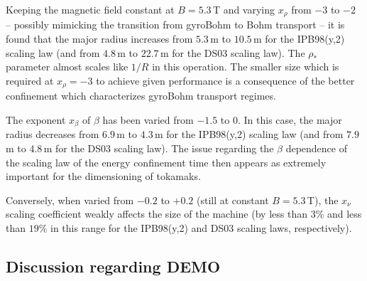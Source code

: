 \documentclass[12pt]{iopart}
\begin{document}
Keeping the magnetic field constant at $B=5.3\,$T and varying $x_\rho$ from $-3$ to $-2$ -- possibly mimicking the transition from gyroBohm to Bohm transport -- it is found that the major radius increases from $5.3\,$m to $10.5\,$m for the IPB98(y,2) scaling law (and from $4.8\,$m to $22.7\,$m for the DS03 scaling law). The $\rho_*$ parameter almost scales like $1/R$ in this operation. The smaller size which is required at $x_\rho =-3$ to achieve given performance is a consequence of the better confinement which characterizes gyroBohm transport regimes. 

The exponent $x_\beta$ of $\beta$ has been varied from $-1.5$ to $0$. In this case, the major radius decreases from $6.9\,$m to $4.3\,$m for the IPB98(y,2) scaling law (and from $7.9\,$m to $4.8\,$m for the DS03 scaling law). The issue regarding the $\beta$ dependence of the scaling law of the energy confinement time then appears as extremely important for the dimensioning of tokamaks.

Conversely, when varied from $-0.2$ to $+0.2$ (still at constant $B=5.3\,$T), the $x_\nu$ scaling coefficient weakly affects the size of the machine (by less than $3\%$ and less than $19\%$ in this range for the IPB98(y,2) and DS03 scaling laws, respectively).


\subsection{Discussion regarding DEMO} \label{subsec:DEMO}
\end{document}
